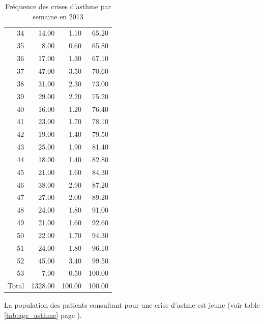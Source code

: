 \documentclass[12pt,english,french,twoside]{report}\usepackage[]{graphicx}\usepackage[]{color}
\begin{document}
\begin{table}[ht]
\begin{tabular}{rrrr}
  34 & 14.00 & 1.10 & 65.20 \\ 
  35 & 8.00 & 0.60 & 65.80 \\ 
  36 & 17.00 & 1.30 & 67.10 \\ 
  37 & 47.00 & 3.50 & 70.60 \\ 
  38 & 31.00 & 2.30 & 73.00 \\ 
  39 & 29.00 & 2.20 & 75.20 \\ 
  40 & 16.00 & 1.20 & 76.40 \\ 
  41 & 23.00 & 1.70 & 78.10 \\ 
  42 & 19.00 & 1.40 & 79.50 \\ 
  43 & 25.00 & 1.90 & 81.40 \\ 
  44 & 18.00 & 1.40 & 82.80 \\ 
  45 & 21.00 & 1.60 & 84.30 \\ 
  46 & 38.00 & 2.90 & 87.20 \\ 
  47 & 27.00 & 2.00 & 89.20 \\ 
  48 & 24.00 & 1.80 & 91.00 \\ 
  49 & 21.00 & 1.60 & 92.60 \\ 
  50 & 22.00 & 1.70 & 94.30 \\ 
  51 & 24.00 & 1.80 & 96.10 \\ 
  52 & 45.00 & 3.40 & 99.50 \\ 
  53 & 7.00 & 0.50 & 100.00 \\ 
    Total & 1328.00 & 100.00 & 100.00 \\ 
   \hline
\end{tabular}
\caption[Fréquence des crises d'asthme]{Fréquence des crises d'asthme par semaine en 2013} 
\label{tab:freq_asthme}
\end{table}




La population des patients consultant pour une crise d'astme est jeune (voir table \ref{tab:age_asthme} page \pageref{tab:age_asthme}).
\end{document}
